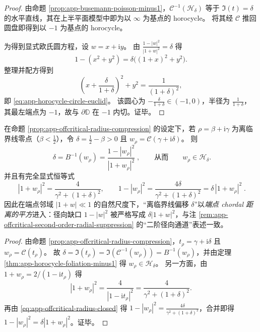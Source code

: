 \begin{proof}
由命题 \ref{prop:app-busemann-poisson-minus1}，\(\mathcal{C}^{-1}(\mathcal{H}_{\delta})\) 等于 \(\Im(t)=\delta\) 的水平直线，其在上半平面模型中即为以 \(\infty\) 为基点的 horocycle。
将其经 \(\mathcal{C}\) 推回圆盘即得到以 \(-1\) 为基点的 horocycle。
\par
为得到显式欧氏圆方程，设 \(w=x+\mathrm{i}y\)。
由 \(\frac{1-|w|^{2}}{|1+w|^{2}}=\delta\) 得
\[
1-(x^{2}+y^{2})=\delta\bigl((1+x)^{2}+y^{2}\bigr).
\]
整理并配方得到
\[
\left(x+\frac{\delta}{1+\delta}\right)^{2}+y^{2}=\frac{1}{(1+\delta)^{2}},
\]
即 \eqref{eq:app-horocycle-circle-euclid}。
该圆心为 \(-\frac{\delta}{1+\delta}\in(-1,0)\)，半径为 \(\frac{1}{1+\delta}\)，其最左端点为 \(-1\)，故与 \(\partial\mathbb{D}\) 在 \(-1\) 内切。证毕。
\end{proof}

\begin{corollary}\label{cor:app-offcritical-horocycle-busemann}
在命题 \ref{prop:app-offcritical-radius-compression} 的设定下，若 \(\rho=\beta+\mathrm{i}\gamma\) 为离临界线零点（\(\beta<\tfrac12\)），令 \(\delta=\tfrac12-\beta>0\) 且 \(w_{\rho}=\mathcal{C}(\gamma+\mathrm{i}\delta)\)。
则
\[
\boxed{\;\delta=B^{-1}(w_{\rho})=\frac{1-|w_{\rho}|^{2}}{|1+w_{\rho}|^{2}}\;},
\qquad\text{从而}\qquad
w_{\rho}\in\mathcal{H}_{\delta}.
\]
并且有完全显式恒等式
\[
\boxed{\;
|1+w_{\rho}|^{2}=\frac{4}{\gamma^{2}+(1+\delta)^{2}},
\qquad
1-|w_{\rho}|^{2}=\frac{4\delta}{\gamma^{2}+(1+\delta)^{2}}
=\delta\,|1+w_{\rho}|^{2}\; }.
\]
因此在端点邻域 \(|1+w|\ll 1\) 的自然尺度下，“离临界线偏移 \(\delta\)”以\emph{端点 chordal 距离的平方}进入：径向缺口 \(1-|w|^{2}\) 被严格写成 \(\delta|1+w|^{2}\)，与注 \ref{rem:app-offcritical-second-order-radial-suppression} 的“二阶径向通道”表述一致。
\end{corollary}

\begin{proof}
由命题 \ref{prop:app-offcritical-radius-compression}，\(t_{\rho}=\gamma+\mathrm{i}\delta\) 且 \(w_{\rho}=\mathcal{C}(t_{\rho})\)。
故 \(\delta=\Im(t_{\rho})=\Im(\mathcal{C}^{-1}(w_{\rho}))=B^{-1}(w_{\rho})\)，并由定理 \ref{thm:app-horocycle-foliation-minus1} 得 \(w_{\rho}\in\mathcal{H}_{\delta}\)。
另一方面，由 \(1+w_{\rho}=2/(1-\mathrm{i}t_{\rho})\) 得
\[
|1+w_{\rho}|^{2}=\frac{4}{|1-\mathrm{i}t_{\rho}|^{2}}
=\frac{4}{\gamma^{2}+(1+\delta)^{2}}.
\]
再由 \eqref{eq:app-offcritical-radius-closed} 得
\(
1-|w_{\rho}|^{2}=\frac{4\delta}{\gamma^{2}+(1+\delta)^{2}}
\)，合并即得 \(1-|w_{\rho}|^{2}=\delta|1+w_{\rho}|^{2}\)。证毕。
\end{proof}

